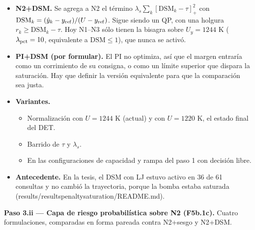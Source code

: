 \documentclass[11pt,a4paper]{article}
\newcommand{\codeus}{\textunderscore\allowbreak}
\newcommand{\code}[1]{{\small\ttfamily\let\_\codeus #1}}
\begin{document}
\begin{itemize}
\item \textbf{N2+DSM.} Se agrega a N2 el término $\lambda_s\sum_k[\mathrm{DSM}_k-\tau]_+^2$ con $\mathrm{DSM}_k=(\hat y_k-y_{\rm ref})/(U-y_{\rm ref})$. Sigue siendo un QP, con una holgura $r_k\ge\mathrm{DSM}_k-\tau$. Hoy N1–N3 sólo tienen la bisagra sobre $U_y=1244$ K ($\lambda_{\rm pct}=10$, equivalente a $\mathrm{DSM}\le1$), que nunca se activó.
\item \textbf{PI+DSM (por formular).} El PI no optimiza, así que el margen entraría como un corrimiento de su consigna, o como un límite superior que dispara la saturación. Hay que definir la versión equivalente para que la comparación sea justa.
\item \textbf{Variantes.}
\begin{itemize}
\item Normalización con $U=1244$ K (actual) y con $U=1220$ K, el estado final del DET.
\item Barrido de $\tau$ y $\lambda_s$.
\item En las configuraciones de capacidad y rampa del paso 1 con decisión libre.
\end{itemize}
\item \textbf{Antecedente.} En la tesis, el DSM con LJ estuvo activo en 36 de 61 consultas y no cambió la trayectoria, porque la bomba estaba saturada (\code{results/results\_penalty\_saturation/README.md}).
\end{itemize}

\textbf{Paso 3.ii — Capa de riesgo probabilística sobre N2 (F5b.1c).} Cuatro formulaciones, comparadas en forma pareada contra N2+sesgo y N2+DSM.
\end{document}
